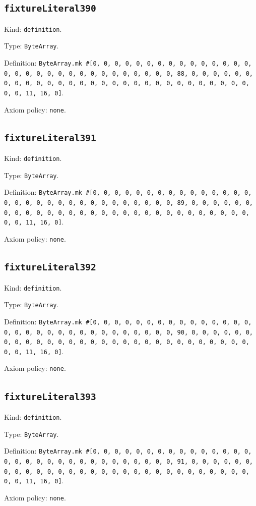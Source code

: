 \documentclass[11pt]{article}
\begin{document}
\subsection*{\texttt{fixtureLiteral390}}
\noindent Kind: \texttt{definition}.\par
\noindent Type: \texttt{ByteArray}.\par
\noindent Definition: \texttt{ByteArray.mk \#[0, 0, 0, 0, 0, 0, 0, 0, 0, 0, 0, 0, 0, 0, 0, 0, 0, 0, 0, 0, 0, 0, 0, 0, 0, 0, 0, 0, 0, 0, 0, 88, 0, 0, 0, 0, 0, 0, 0, 0, 0, 0, 0, 0, 0, 0, 0, 0, 0, 0, 0, 0, 0, 0, 0, 0, 0, 0, 0, 0, 0, 0, 0, 11, 16, 0]}.\par
\noindent Axiom policy: \texttt{none}.\par
\subsection*{\texttt{fixtureLiteral391}}
\noindent Kind: \texttt{definition}.\par
\noindent Type: \texttt{ByteArray}.\par
\noindent Definition: \texttt{ByteArray.mk \#[0, 0, 0, 0, 0, 0, 0, 0, 0, 0, 0, 0, 0, 0, 0, 0, 0, 0, 0, 0, 0, 0, 0, 0, 0, 0, 0, 0, 0, 0, 0, 89, 0, 0, 0, 0, 0, 0, 0, 0, 0, 0, 0, 0, 0, 0, 0, 0, 0, 0, 0, 0, 0, 0, 0, 0, 0, 0, 0, 0, 0, 0, 0, 11, 16, 0]}.\par
\noindent Axiom policy: \texttt{none}.\par
\subsection*{\texttt{fixtureLiteral392}}
\noindent Kind: \texttt{definition}.\par
\noindent Type: \texttt{ByteArray}.\par
\noindent Definition: \texttt{ByteArray.mk \#[0, 0, 0, 0, 0, 0, 0, 0, 0, 0, 0, 0, 0, 0, 0, 0, 0, 0, 0, 0, 0, 0, 0, 0, 0, 0, 0, 0, 0, 0, 0, 90, 0, 0, 0, 0, 0, 0, 0, 0, 0, 0, 0, 0, 0, 0, 0, 0, 0, 0, 0, 0, 0, 0, 0, 0, 0, 0, 0, 0, 0, 0, 0, 11, 16, 0]}.\par
\noindent Axiom policy: \texttt{none}.\par
\subsection*{\texttt{fixtureLiteral393}}
\noindent Kind: \texttt{definition}.\par
\noindent Type: \texttt{ByteArray}.\par
\noindent Definition: \texttt{ByteArray.mk \#[0, 0, 0, 0, 0, 0, 0, 0, 0, 0, 0, 0, 0, 0, 0, 0, 0, 0, 0, 0, 0, 0, 0, 0, 0, 0, 0, 0, 0, 0, 0, 91, 0, 0, 0, 0, 0, 0, 0, 0, 0, 0, 0, 0, 0, 0, 0, 0, 0, 0, 0, 0, 0, 0, 0, 0, 0, 0, 0, 0, 0, 0, 0, 11, 16, 0]}.\par
\noindent Axiom policy: \texttt{none}.\par
\end{document}
